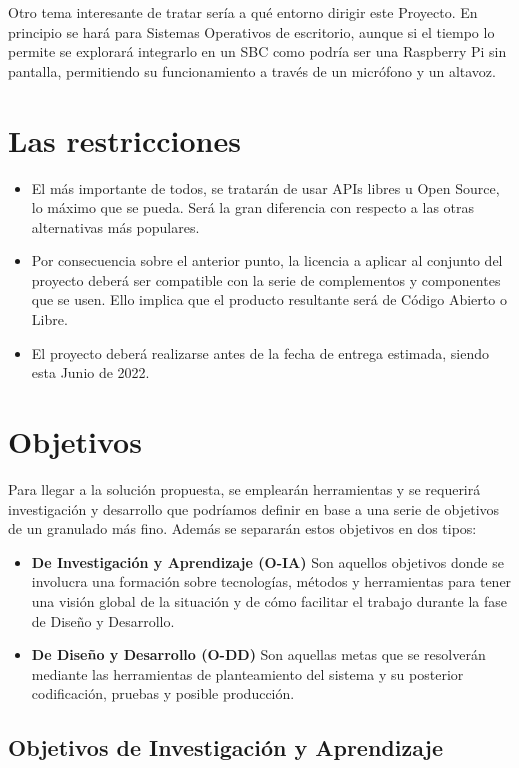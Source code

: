 Otro tema interesante de tratar sería a qué entorno dirigir este Proyecto. En principio se hará para Sistemas Operativos de escritorio, aunque si el tiempo lo permite se explorará integrarlo en un SBC como podría ser una Raspberry Pi sin pantalla, permitiendo su funcionamiento a través de un micrófono y un altavoz. 

\section{Las restricciones}
\begin{itemize}
	\item El más importante de todos, se tratarán de usar APIs libres u Open Source, lo máximo que se pueda. Será la gran diferencia con respecto a las otras alternativas más populares.
	\item Por consecuencia sobre el anterior punto, la licencia a aplicar al conjunto del proyecto deberá ser compatible con la serie de complementos y componentes que se usen. Ello implica que el producto resultante será de Código Abierto o Libre.
	\item El proyecto deberá realizarse antes de la fecha de entrega estimada, siendo esta Junio de 2022.
\end{itemize}

\section{Objetivos}
Para llegar a la solución propuesta, se emplearán herramientas y se requerirá investigación y desarrollo que podríamos definir en base a una serie de objetivos de un granulado más fino. Además se separarán estos objetivos en dos tipos: 
\begin{itemize}
	\item \textbf{De Investigación y Aprendizaje (O-IA)} Son aquellos objetivos donde se involucra una formación sobre tecnologías, métodos y herramientas para tener una visión global de la situación y de cómo facilitar el trabajo durante la fase de Diseño y Desarrollo.
	\item \textbf{De Diseño y Desarrollo (O-DD)} Son aquellas metas que se resolverán mediante las herramientas de planteamiento del sistema y su posterior codificación, pruebas y posible producción.
\end{itemize}

\subsection{Objetivos de Investigación y Aprendizaje}

